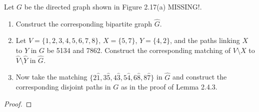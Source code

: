 \prob
{
    Let $G$ be the directed graph shown in Figure 2.17(a) MISSING!.
    \begin{enumerate}[label=(\roman*)]
        \item   Construct the corresponding bipartite graph $\hat{G}$.
        \item   Let $V = \{1,2,3,4,5,6,7,8\}$, $X=\{5,7\}$, $Y=\{4,2\}$,
                and the paths linking $X$ to $Y$ in $G$ be 5134 and 7862. Construct the
                corresponding matching of $V \setminus X$ to $\hat{V} \setminus \hat{Y}$ in $\hat{G}$.
        \item   Now take the matching $\{2\hat{1}, 3\hat{5}, 4\hat{3}, 5\hat{4}, 6\hat{8}, 8\hat{7}\}$ in $\hat{G}$ and 
                construct the corresponding disjoint paths in $G$ as in the proof of Lemma 2.4.3.
    \end{enumerate}
}
\begin{proof}
\end{proof}